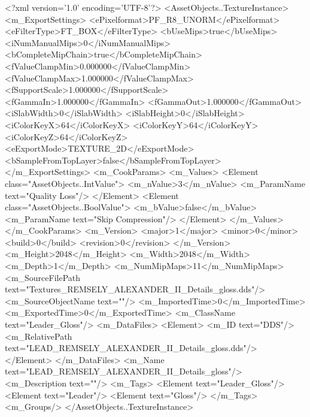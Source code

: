 <?xml version='1.0' encoding='UTF-8'?>
<AssetObjects..TextureInstance>
  <m_ExportSettings>
    <ePixelformat>PF_R8_UNORM</ePixelformat>
    <eFilterType>FT_BOX</eFilterType>
    <bUseMips>true</bUseMips>
    <iNumManualMips>0</iNumManualMips>
    <bCompleteMipChain>true</bCompleteMipChain>
    <fValueClampMin>0.000000</fValueClampMin>
    <fValueClampMax>1.000000</fValueClampMax>
    <fSupportScale>1.000000</fSupportScale>
    <fGammaIn>1.000000</fGammaIn>
    <fGammaOut>1.000000</fGammaOut>
    <iSlabWidth>0</iSlabWidth>
    <iSlabHeight>0</iSlabHeight>
    <iColorKeyX>64</iColorKeyX>
    <iColorKeyY>64</iColorKeyY>
    <iColorKeyZ>64</iColorKeyZ>
    <eExportMode>TEXTURE_2D</eExportMode>
    <bSampleFromTopLayer>false</bSampleFromTopLayer>
  </m_ExportSettings>
  <m_CookParams>
    <m_Values>
      <Element class="AssetObjects..IntValue">
        <m_nValue>3</m_nValue>
        <m_ParamName text="Quality Loss"/>
      </Element>
      <Element class="AssetObjects..BoolValue">
        <m_bValue>false</m_bValue>
        <m_ParamName text="Skip Compression"/>
      </Element>
    </m_Values>
  </m_CookParams>
  <m_Version>
    <major>1</major>
    <minor>0</minor>
    <build>0</build>
    <revision>0</revision>
  </m_Version>
  <m_Height>2048</m_Height>
  <m_Width>2048</m_Width>
  <m_Depth>1</m_Depth>
  <m_NumMipMaps>11</m_NumMipMaps>
  <m_SourceFilePath text="Textures\LEAD_REMSELY_ALEXANDER_II_Details_gloss.dds"/>
  <m_SourceObjectName text=""/>
  <m_ImportedTime>0</m_ImportedTime>
  <m_ExportedTime>0</m_ExportedTime>
  <m_ClassName text="Leader_Gloss"/>
  <m_DataFiles>
    <Element>
      <m_ID text="DDS"/>
      <m_RelativePath text="LEAD_REMSELY_ALEXANDER_II_Details_gloss.dds"/>
    </Element>
  </m_DataFiles>
  <m_Name text="LEAD_REMSELY_ALEXANDER_II_Details_gloss"/>
  <m_Description text=""/>
  <m_Tags>
    <Element text="Leader_Gloss"/>
    <Element text="Leader"/>
    <Element text="Gloss"/>
  </m_Tags>
  <m_Groups/>
</AssetObjects..TextureInstance>
